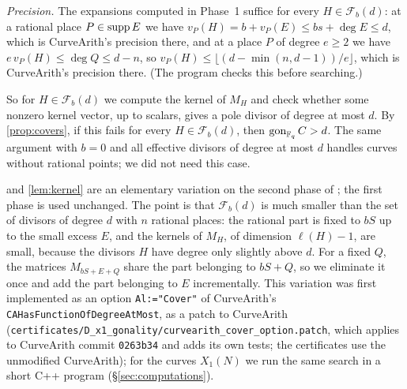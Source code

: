 \emph{Precision.} The expansions computed in Phase~1 suffice for every $H\in\mathcal F_b(d)$: at a rational place
$P\in\operatorname{supp} E$ we have $v_P(H)=b+v_P(E)\le bs+\deg E\le d$, which is CurveArith's precision there, and at a place
$P$ of degree $e\ge2$ we have $e\,v_P(H)\le\deg Q\le d-n$, so $v_P(H)\le\lfloor(d-\min(n,d-1))/e\rfloor$, which is
CurveArith's precision there. (The program checks this before searching.)

So for $H\in\mathcal F_b(d)$ we compute the kernel of $M_H$ and check whether some nonzero kernel vector, up
to scalars, gives a pole divisor of degree at most $d$. By \cref{prop:covers}, if this fails for every
$H\in\mathcal F_b(d)$, then $\operatorname{gon}_{\mathbb{F}_q}C>d$. The same argument with $b=0$ and all effective divisors of degree
at most $d$ handles curves without rational points; we did not need this case.

\begin{remark}
 and \cref{lem:kernel} are an elementary variation on the second phase of
\cite{DerickxTerao}; the first phase is used unchanged. The point is that $\mathcal F_b(d)$ is much smaller
than the set of divisors of degree $d$ with $n$ rational places: the rational part is fixed to $bS$ up to the
small excess $E$, and the kernels of $M_H$, of dimension $\ell(H)-1$, are small, because the divisors $H$ have
degree only slightly above $d$. For a fixed $Q$, the matrices $M_{bS+E+Q}$ share the part belonging to $bS+Q$, so we
eliminate it once and add the part belonging to $E$ incrementally. This variation was first implemented as an option
\texttt{Al:="Cover"} of CurveArith's \texttt{CAHasFunctionOfDegreeAtMost}, as a patch to CurveArith
(\texttt{certificates/D\_x1\_gonality/curvearith\_cover\_option.patch}, which applies to CurveArith commit
\texttt{0263b34} and adds its own tests; the certificates use the unmodified CurveArith); for the curves $X_1(N)$ we run
the same search in a short C++ program (\S\ref{sec:computations}).
\end{remark}

